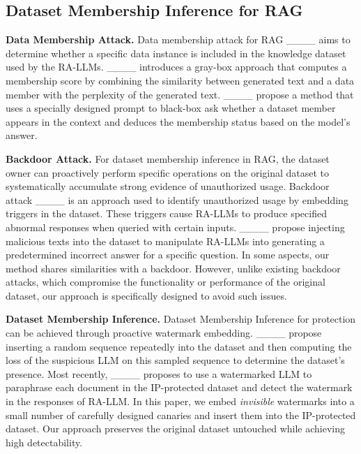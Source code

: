 \subsection{Dataset Membership Inference for RAG} 
\vspace{-0.5em}
\textbf{Data Membership Attack.} Data membership attack for RAG ____ aims to determine whether a specific data instance is included in the knowledge dataset used by the RA-LLMs. ____ introduces a gray-box approach that computes a membership score by combining the similarity between generated text and a data member with the perplexity of the generated text. ____ propose a method that uses a specially designed prompt to black-box ask whether a dataset member appears in the context and deduces the membership status based on the model's answer.

\textbf{Backdoor Attack.} For dataset membership inference in RAG, the dataset owner can proactively perform specific operations on the original dataset to systematically accumulate strong evidence of unauthorized usage. Backdoor attack ____ is an approach used to identify unauthorized usage by embedding triggers in the dataset. These triggers cause RA-LLMs to produce specified abnormal responses when queried with certain inputs. ____ propose injecting malicious texts into the dataset to manipulate RA-LLMs into generating a predetermined incorrect answer for a specific question. In some aspects, our method shares similarities with a backdoor. However, unlike existing backdoor attacks, which compromise the functionality or performance of the original dataset, our approach is specifically designed to avoid such issues.


\textbf{Dataset Membership Inference.} 
Dataset Membership Inference for protection can be achieved through proactive watermark embedding.
____ propose inserting a random sequence repeatedly into the dataset and then computing the loss of the suspicious LLM on this sampled sequence to determine the dataset's presence. Most recently, ____ proposes to use a watermarked LLM to paraphrase each document in the IP-protected dataset and detect the watermark in the responses of RA-LLM. In this paper, we embed \emph{invisible} watermarks into a small number of carefully designed canaries and insert them into the IP-protected dataset. Our approach preserves the original dataset untouched while achieving high detectability.




